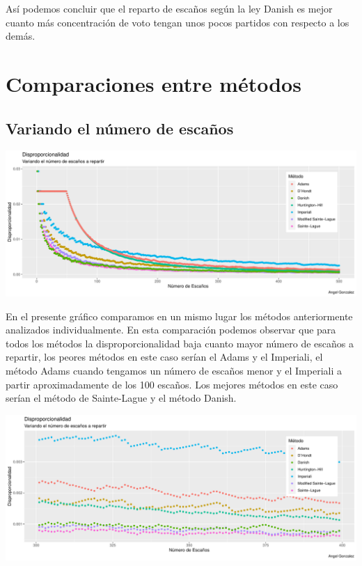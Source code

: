 \documentclass[12pt,a4paper,]{book}
\numberwithin{dummy}{section}
\theoremstyle{ocrenumbox}
\theoremstyle{blacknumex}
\theoremstyle{blacknumbox}
\theoremstyle{ocrenum}
\theoremstyle{ocrenum}
\begin{document}
Así podemos concluir que el reparto de escaños según la ley Danish es
mejor cuanto más concentración de voto tengan unos pocos partidos con
respecto a los demás.

\hypertarget{comparaciones-entre-muxe9todos}{%
\section{Comparaciones entre
métodos}\label{comparaciones-entre-muxe9todos}}

\hypertarget{variando-el-nuxfamero-de-escauxf1os}{%
\subsection{Variando el número de
escaños}\label{variando-el-nuxfamero-de-escauxf1os}}

\begin{center}\includegraphics[width=0.95\linewidth]{figurasR/unnamed-chunk-42-1} \end{center}

En el presente gráfico comparamos en un mismo lugar los métodos
anteriormente analizados individualmente. En esta comparación podemos
observar que para todos los métodos la disproporcionalidad baja cuanto
mayor número de escaños a repartir, los peores métodos en este caso
serían el Adams y el Imperiali, el método Adams cuando tengamos un
número de escaños menor y el Imperiali a partir aproximadamente de los
100 escaños. Los mejores métodos en este caso serían el método de
Sainte-Lague y el método Danish.

\begin{center}\includegraphics[width=0.95\linewidth]{figurasR/unnamed-chunk-43-1} \end{center}
\end{document}
